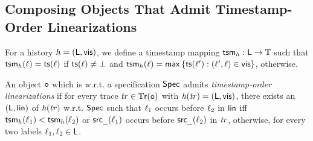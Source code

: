 
\subsection{Composing Objects That Admit Timestamp-Order Linearizations}

%



For a history ${h}=(\mathsf{L},\mathsf{vis})$, we define a timestamp mapping $\mathsf{tsm}_{{h}}:\mathsf{L}\rightarrow \mathbb{T}$ such that $\mathsf{tsm}_{{h}}(\ell)=\mathsf{ts}(\ell)$ if $\mathsf{ts}(\ell)\neq\bot$ and $\mathsf{tsm}_{{h}}(\ell)=\mathsf{max}\, \{\mathsf{ts}(\ell'):(\ell',\ell)\in \mathsf{vis} \}$, otherwise.


\begin{definition}
An object $\mathtt{o}$ which is \crdtlinearizable{} w.r.t. a specification $\mathsf{Spec}$ admits \emph{timestamp-order linearizations} if for every trace $\mathit{tr}\in\mathbb{T}\mathsf{r}(\mathtt{o})$ with $\mathit{h}({\mathit{tr})}=(\mathsf{L},\mathsf{vis})$, there exists an \crdtlinearization{} $(\mathsf{L},\mathsf{lin})$ of $\mathit{h}({\mathit{tr})}$ w.r.t. $\mathsf{Spec}$ such that $\ell_1$ occurs before $\ell_2$ in $\mathsf{lin}$ iff $\mathsf{tsm}_{{h}}(\ell_1) < \mathsf{tsm}_{{h}}(\ell_2)$ or $\mathsf{src}_{\_}(\ell_1)$ occurs before $\mathsf{src}_{\_}(\ell_2)$ in $\mathit{tr}$, otherwise, for every two labels $\ell_1,\ell_2\in\mathsf{L}$.
\end{definition}

